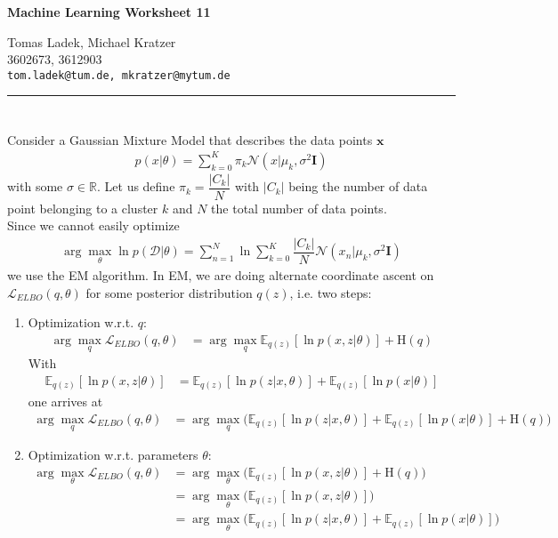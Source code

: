 \documentclass[11pt]{article}
\makeatletter
\newcommand{\exercise}{\section{}}
\newcommand{\hwhead}[4]{
\begin{center}
\sffamily\large\bfseries Machine Learning Worksheet #1
\vspace{2mm}
\normalfont

#2\\
#3\\
\texttt{#4}
\end{center}
\vspace{6mm} \hrule \vspace{4mm}
}
\newcommand{\names}{Tomas Ladek, Michael Kratzer} %
\newcommand{\imats}{3602673, 3612903} %
\newcommand{\emails}{tom.ladek@tum.de, mkratzer@mytum.de} %
\makeatother
\begin{document}
\hwhead{11}{\names}{\imats}{\emails}


\exercise
Consider a Gaussian Mixture Model that describes the data points $\boldsymbol{x}$
\begin{align*}
	p (x | \theta) = \sum_{k = 0}^{K} \pi_k \mathcal N(x | \mu_k, \sigma^2 \boldsymbol{I})
\end{align*}
with some $\sigma \in \mathbb{R}$. Let us define $\pi_k = \dfrac{|C_k|}{N}$ with $|C_k|$ being the number of data point belonging to a cluster $k$ and $N$ the total number of data points.\\

\noindent Since we cannot easily optimize
\begin{align*}
	\arg \max_{\theta} \ln p(\mathcal{D}|\theta) = \sum_{n=1}^{N} \ln \sum_{k=0}^{K} \dfrac{|C_k|}{N} \mathcal{N}(x_n | \mu_k, \sigma^2 \boldsymbol{I})
\end{align*}
we use the EM algorithm. In EM, we are doing alternate coordinate ascent on $\mathcal{L}_{ELBO}(q, \theta)$ for some posterior distribution $q(z)$, i.e. two steps:
\begin{enumerate}
	\item Optimization w.r.t. $q$:
	\begin{align*}
		\arg \max_q \mathcal{L}_{ELBO}(q, \theta) &= \arg \max_q \mathbb{E}_{q(z)}[\ln p(x, z | \theta)] + \text{H}(q)
	\end{align*}
	With
	\begin{align*}
		\mathbb{E}_{q(z)}[\ln p(x, z | \theta)] &= \mathbb{E}_{q(z)}[\ln p(z | x, \theta)] + \mathbb{E}_{q(z)}[\ln p(x | \theta)]
	\end{align*}
	one arrives at
	\begin{align*}
		\arg \max_q \mathcal{L}_{ELBO}(q, \theta) &= \arg \max_q \big(\mathbb{E}_{q(z)}[\ln p(z | x, \theta)] + \mathbb{E}_{q(z)}[\ln p(x | \theta)] + \text{H}(q)\big)
	\end{align*}

	\item Optimization w.r.t. parameters $\theta$:
	\begin{align*}
	\arg \max_{\theta} \mathcal{L}_{ELBO}(q, \theta) &= \arg \max_{\theta} \big(\mathbb{E}_{q(z)}[\ln p(x, z | \theta)] + \text{H}(q)\big)\\
	&= \arg \max_{\theta} \big(\mathbb{E}_{q(z)}[\ln p(x, z | \theta)]\big)\\
	&= \arg \max_{\theta} \big(\mathbb{E}_{q(z)}[\ln p(z | x, \theta)] + \mathbb{E}_{q(z)}[\ln p(x | \theta)]\big)
	\end{align*}
\end{enumerate}
\end{document}
